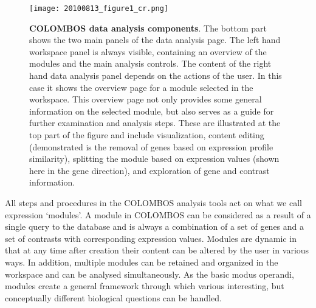 \begin{figure}
	\centering
  	\texttt{[image: 20100813\_figure1\_cr.png]}
  	\caption[COLOMBOS data analysis components]{\textbf{COLOMBOS data analysis    	components}. 
  	The bottom part shows the two main panels of the data analysis 
  	page. The left hand workspace panel is always visible, containing an 
  	overview of the modules and the main analysis controls. The content of the 
  	right hand data analysis panel depends on the actions of the user. In this 
  	case it shows the overview page for a module selected in the workspace. 
  	This overview page not only provides some general information on the 
  	selected module, but also serves as a guide for further examination and 
  	analysis steps. These are illustrated at the top part of the figure and 
  	include visualization, content editing (demonstrated is the removal of 
  	genes based on expression profile similarity), splitting the module based 
  	on expression values (shown here in the gene direction), and exploration of 
  	gene and contrast information.}
  	\label{fig:colombos-tools}
\end{figure}


All steps and procedures in the COLOMBOS analysis tools act on what we call  expression `modules'. A module in COLOMBOS can be considered as a result of a  single query to the database and is always a combination of a set of genes and  a set of contrasts with corresponding expression values. Modules are dynamic in  that at any time after creation their content can be altered by the user in  various ways. In addition, multiple modules can be retained and organized in  the workspace and can be analysed simultaneously. As the basic modus operandi,  modules create a general framework through which various interesting, but  conceptually different biological questions can be handled.

